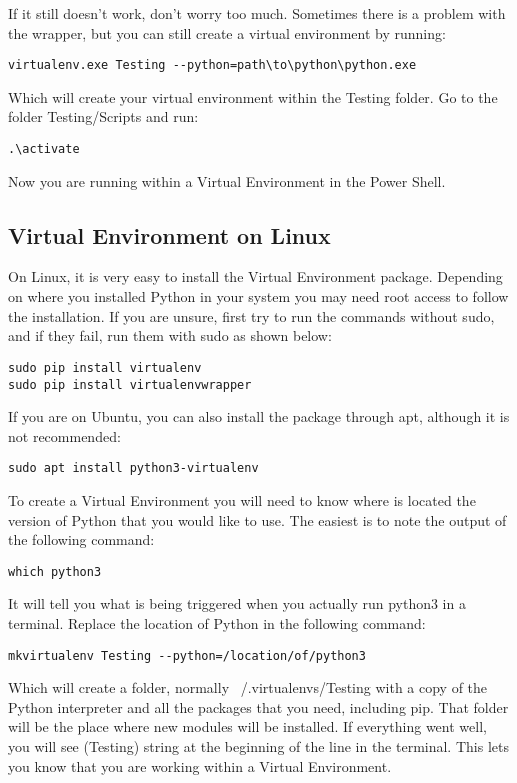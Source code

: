 If it still doesn’t work, don’t worry too much. Sometimes there is a problem with the wrapper, but you can still create a virtual environment by running:
\begin{verbatim}
virtualenv.exe Testing --python=path\to\python\python.exe
\end{verbatim}

Which will create your virtual environment within the Testing folder. Go to the folder Testing/Scripts and run:
\begin{verbatim}
.\activate
\end{verbatim}

Now you are running within a Virtual Environment in the Power Shell.

\subsection{Virtual Environment on Linux}

On Linux, it is very easy to install the Virtual Environment package. Depending on where you installed Python in your system you may need root access to follow the installation. If you are unsure, first try to run the commands without sudo, and if they fail, run them with sudo as shown below:

\begin{verbatim}
sudo pip install virtualenv
sudo pip install virtualenvwrapper
\end{verbatim}

If you are on Ubuntu, you can also install the package through apt, although it is not recommended:
\begin{verbatim}
sudo apt install python3-virtualenv
\end{verbatim}

To create a Virtual Environment you will need to know where is located the version of Python that you would like to use. The easiest is to note the output of the following command:

\begin{verbatim}
which python3
\end{verbatim}

It will tell you what is being triggered when you actually run python3 in a terminal. Replace the location of Python in the following command:
\begin{verbatim}
mkvirtualenv Testing --python=/location/of/python3
\end{verbatim}

Which will create a folder, normally ~/.virtualenvs/Testing with a copy of the Python interpreter and all the packages that you need, including pip. That folder will be the place where new modules will be installed. If everything went well, you will see (Testing) string at the beginning of the line in the terminal. This lets you know that you are working within a Virtual Environment.

